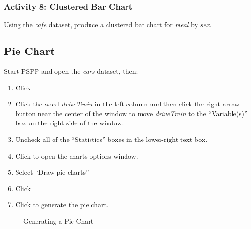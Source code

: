 \subsubsection{Activity 8: Clustered Bar Chart} \label{lab02_act08}

Using the \textit{cafe} dataset, produce a clustered bar chart for \textit{meal} by \textit{sex}.

\subsection{Pie Chart}

Start \acs{PSPP} and open the \textit{cars} dataset, then:

\begin{enumerate}
  \item Click \textsc{}
  \item Click the word \textit{driveTrain} in the left column and then click the right-arrow button near the center of the window to move \textit{driveTrain} to the ``Variable(s)'' box on the right side of the window.
  \item Uncheck all of the ``Statistics'' boxes in the lower-right text box.
  \item Click  to open the charts options window.
  \item Select ``Draw pie charts''
  \item Click 
  \item Click  to generate the pie chart.
\end{enumerate}

\begin{figure}[H]
  \begin{center}
    \caption{Generating a Pie Chart}
    \label{lab02_fig21}
  \end{center}
\end{figure}

